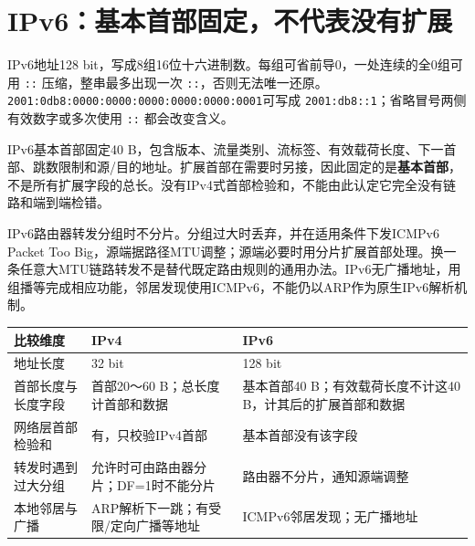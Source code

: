 \section{IPv6：基本首部固定，不代表没有扩展}\label{CN04-14}

IPv6地址128 bit，写成8组16位十六进制数。每组可省前导0，一处连续的全0组可用 \texttt{:\allowbreak{}:\allowbreak{}} 压缩，整串最多出现一次 \texttt{:\allowbreak{}:\allowbreak{}}，否则无法唯一还原。\texttt{2001:\allowbreak{}0db8:\allowbreak{}0000:\allowbreak{}0000:\allowbreak{}0000:\allowbreak{}0000:\allowbreak{}0000:\allowbreak{}0001}可写成 \texttt{2001:\allowbreak{}db8:\allowbreak{}:\allowbreak{}1}；省略冒号两侧有效数字或多次使用 \texttt{:\allowbreak{}:\allowbreak{}} 都会改变含义。

IPv6基本首部固定40 B，包含版本、流量类别、流标签、有效载荷长度、下一首部、跳数限制和源/目的地址。扩展首部在需要时另接，因此固定的是\textbf{基本首部}，不是所有扩展字段的总长。没有IPv4式首部检验和，不能由此认定它完全没有链路和端到端检错。

IPv6路由器转发分组时不分片。分组过大时丢弃，并在适用条件下发ICMPv6 Packet Too Big，源端据路径MTU调整；源端必要时用分片扩展首部处理。换一条任意大MTU链路转发不是替代既定路由规则的通用办法。IPv6无广播地址，用组播等完成相应功能，邻居发现使用ICMPv6，不能仍以ARP作为原生IPv6解析机制。

\begin{wideblock}

\par\medskip\noindent\begin{minipage}{\linewidth}\fontsize{9.3}{12}\selectfont\begin{tabularx}{\linewidth}{@{}YYY@{}}
\toprule\noalign{}
\begin{minipage}[b]{\linewidth}\raggedright
比较维度
\end{minipage} & \begin{minipage}[b]{\linewidth}\raggedright
IPv4
\end{minipage} & \begin{minipage}[b]{\linewidth}\raggedright
IPv6
\end{minipage} \\
\midrule\noalign{}


地址长度 & 32 bit & 128 bit \\
首部长度与长度字段 & 首部20～60 B；总长度计首部和数据 & 基本首部40 B；有效载荷长度不计这40 B，计其后的扩展首部和数据 \\
网络层首部检验和 & 有，只校验IPv4首部 & 基本首部没有该字段 \\
转发时遇到过大分组 & 允许时可由路由器分片；DF=1时不能分片 & 路由器不分片，通知源端调整 \\
本地邻居与广播 & ARP解析下一跳；有受限/定向广播等地址 & ICMPv6邻居发现；无广播地址 \\
\bottomrule\end{tabularx}
\end{minipage}\par\medskip

\end{wideblock}


